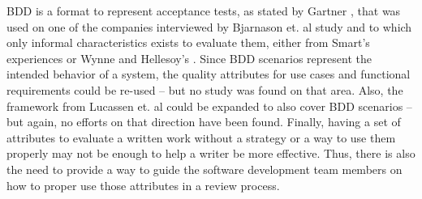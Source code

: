 BDD is a format to represent acceptance tests, as stated by Gartner \cite{Gartner_2012}, that was used on one of the companies interviewed by Bjarnason et. al \cite{Bjarnason_et_dot_al_2016} study and to which only informal characteristics exists to evaluate them, either from Smart's experiences \cite{Smart_2014} or Wynne and Hellesoy's \cite{Wynne_and_Hellesoy_2012}. Since BDD scenarios represent the intended behavior of a system, the quality attributes for use cases and functional requirements could be re-used -- but no study was found on that area. Also, the framework from Lucassen et. al \cite{Lucassen_et_dot_al_2015} could be expanded to also cover BDD scenarios -- but again, no efforts on that direction have been found. Finally, having a set of attributes to evaluate a written work without a strategy or a way to use them properly may not be enough to help a writer be more effective. Thus, there is also the need to provide a way to guide the software development team members on how to proper use those attributes in a review process.
